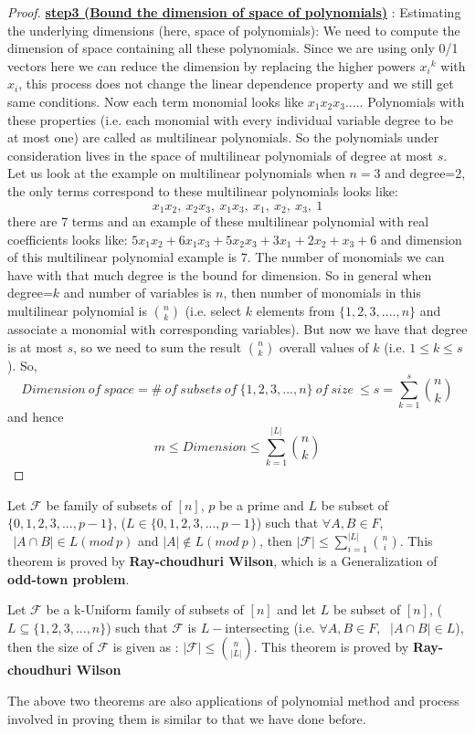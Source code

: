 \begin{proof}
\underline{\textbf{step3 (Bound the dimension of space of polynomials)}} : 
Estimating the underlying dimensions (here, space of polynomials):
We need to compute the dimension of space containing all these polynomials. Since we are using only 0/1 vectors here we can reduce the dimension by replacing the higher powers ${x_i}^k$ with $x_i$, this process does not change the linear dependence property and we still get same conditions. Now each term monomial looks like $x_1x_2x_3....$. Polynomials with these properties (i.e. each monomial with every individual variable degree to be at most one) are called as multilinear polynomials. So the polynomials under consideration lives in the space of multilinear polynomials of degree at most $s$.
\\
Let us look at the example on multilinear polynomials when $n=3$ and degree=2, the only terms correspond to these multilinear polynomials looks like:
$$x_1 x_2, ~x_2 x_3, ~x_1 x_3, ~x_1, ~x_2, ~x_3, ~1$$ there are 7 terms and an example of these multilinear polynomial with real coefficients looks like:
$5x_1 x_2 + 6x_1 x_3 + 5x_2 x_3 + 3x_1 + 2x_2 + x_3 + 6$
and dimension of this multilinear polynomial example is $7$. The number of monomials we can have with that much degree is the bound for dimension. So in general when degree=$k$ and number of variables is $n$, then number of monomials in this multilinear polynomial is $n \choose k$ (i.e. select $k$ elements from $\{1,2,3,....,n\}$ and associate a monomial with corresponding variables). But now we have that degree is at most $s$, so we need to sum the result $n \choose k$ overall values of $k$ (i.e. $1 \le k \le s$). So,
$$Dimension ~of ~space = \# ~of~ subsets~ of ~\{1,2,3,...,n\} ~of~ size ~\le s = \sum_{k=1}^{s}{n\choose k}$$
and hence
$$m \le Dimension \le \sum_{k=1}^{|L|}{n \choose k}$$
\end{proof}


\begin{theorem}
Let $\mathcal{F}$ be family of subsets of $[n]$, $p$ be a prime and $L$ be subset of $\{0,1,2,3,...,p-1\}$, ($L \in \{0,1,2,3,...,p-1\}$) such that $\forall A, B \in F$, $~~|A \cap B| \in L (mod~p)$ and $|A| \notin L (mod~p)$, then $|\mathcal{F}| \le \sum_{i=1}^{|L|} {n \choose i}$. This theorem is proved by \textbf{Ray-choudhuri Wilson}, which is a Generalization of \textbf{odd-town problem}. 
\end{theorem}

\begin{theorem}
Let $\mathcal{F}$ be a k-Uniform family of subsets of $[n]$ and let $L$ be subset of $[n]$,  ($L \subseteq \{1,2,3,...,n\}$) such that $\mathcal{F}$ is $L-$intersecting (i.e. $\forall A, B \in F$, $~~|A \cap B| \in L$), then the size of $\mathcal{F}$ is given as : $|\mathcal{F}|\le {n \choose |L|}$. This theorem is proved by \textbf{Ray-choudhuri Wilson}  
\end{theorem}

The above two theorems are also applications of polynomial method and process involved in proving them is similar to that we have done before.

